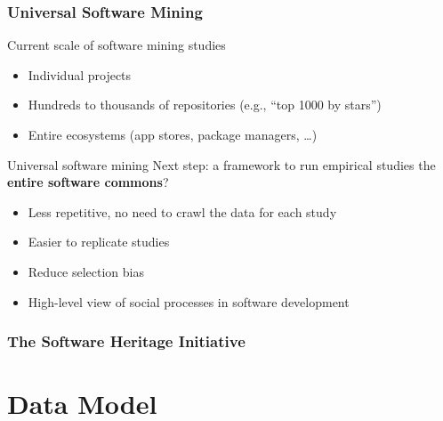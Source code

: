 \documentclass[aspectratio=169,xcolor=table]{beamer}
\begin{document}
    \begin{frame}
        \frametitle{Universal Software Mining}

        \begin{block}{Current scale of software mining studies}
            \begin{itemize}
                \item Individual projects
                \item Hundreds to thousands of repositories (e.g., ``top
                    1000 by stars'')
                \item Entire ecosystems (app stores, package managers, …)
            \end{itemize}
        \end{block}

        \begin{block}{Universal software mining}
            Next step: a framework to run empirical studies the
            \textbf{entire software commons}?

            \begin{itemize}
                \item Less repetitive, no need to crawl the data for each study
                \item Easier to replicate studies
                \item Reduce selection bias
                \item High-level view of social processes in software
                    development
            \end{itemize}
        \end{block}
    \end{frame}

    \begin{frame}
        \frametitle{The Software Heritage Initiative}
        
    \end{frame}

    \section{Data Model}
\end{document}
